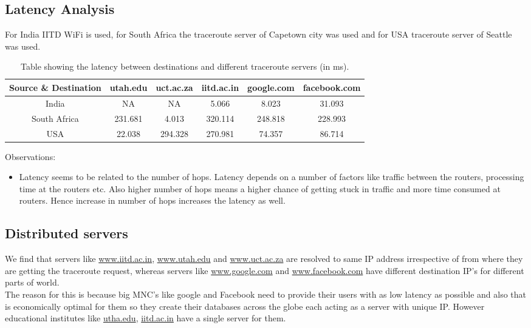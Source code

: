 \documentclass[11pt]{scrartcl}
\begin{document}
\subsection{Latency Analysis}
For India IITD WiFi is used, for South Africa the traceroute server of Capetown city was used and for USA traceroute server of Seattle was used.
\begin{table}[ht]
\centering
\begin{tabular}{|c|c|c|c|c|c|}
\hline
Source \& Destination & utah.edu & uct.ac.za & iitd.ac.in & google.com & facebook.com \\
\hline
India & NA & NA & 5.066 & 8.023 & 31.093 \\
\hline
South Africa & 231.681 & 4.013 &  320.114 & 248.818 & 228.993\\
\hline
USA &  22.038 & 294.328 & 270.981 & 74.357 & 86.714\\
\hline
\end{tabular}
\caption{Table showing the latency between destinations and different traceroute servers (in ms).}
\label{tab:simple}
\end{table}

Observations:
\begin{itemize}
    \item Latency seems to be related to the number of hops. Latency depends on a number of factors like traffic between the routers, processing time at the routers etc. Also higher number of hops means a higher chance of getting stuck in traffic and more time consumed at routers. Hence increase in number of hops increases the latency as well.

\end{itemize}


\subsection{Distributed servers}
We find that servers like \underline{www.iitd.ac.in}, \underline{www.utah.edu} and \underline{www.uct.ac.za} are resolved to same IP address irrespective of from where they are getting the traceroute request, whereas servers like \underline{www.google.com} and \underline{www.facebook.com} have different destination IP's for different parts of world. 
\\
The reason for this is because big MNC's like google and Facebook need to provide their users with as low latency as possible and also that is economically optimal for them so they create their databases across the globe each acting as a server with unique IP. However educational institutes like \underline{utha.edu}, \underline{iitd.ac.in} have a single server for them. 
\end{document}
